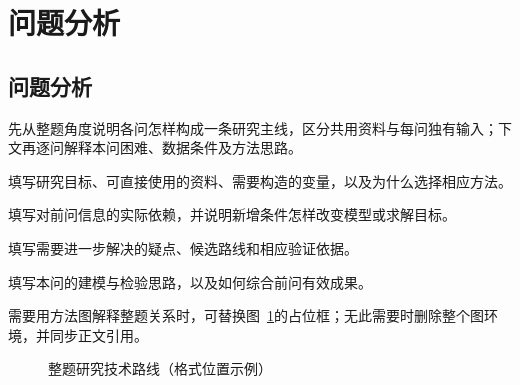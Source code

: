 \section{问题分析}
\subsection{问题分析}
先从整题角度说明各问怎样构成一条研究主线，区分共用资料与每问独有输入；下文再逐问解释本问困难、数据条件及方法思路。

填写研究目标、可直接使用的资料、需要构造的变量，以及为什么选择相应方法。

填写对前问信息的实际依赖，并说明新增条件怎样改变模型或求解目标。

填写需要进一步解决的疑点、候选路线和相应验证依据。

填写本问的建模与检验思路，以及如何综合前问有效成果。

需要用方法图解释整题关系时，可替换图~\ref{fig:roadmap}的占位框；无此需要时删除整个图环境，并同步正文引用。
\begin{figure}[htbp]
\centering
{}
\caption{整题研究技术路线（格式位置示例）}\label{fig:roadmap}
\end{figure}
\FloatBarrier
